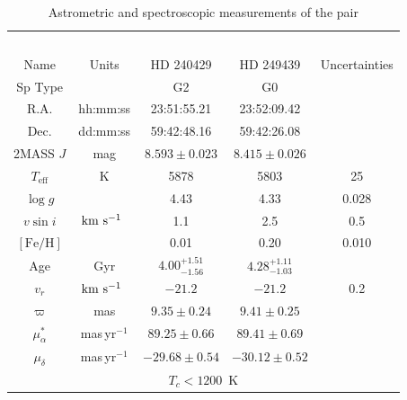 \documentclass[12pt,letterpaper,margin=1in]{article}
\newcommand*\elem[1]{\ensuremath{\mathrm{#1}}}
\newcommand{\sunanalog}{\text{Krios}}
\newcommand{\bizarreone}{\text{Kronos}}
\newcommand{\kms}{\ensuremath{\rm km~s^{-1}}}
\begin{document}
\begin{table}[htpb]
  \centering
  \begin{threeparttable}
  \caption{Astrometric and spectroscopic measurements of the pair\label{tab:t1}}
\begin{tabular}{ccccc}
\hline\hline
                        &                & \sunanalog\            & \bizarreone\           &               \\
Name                    & Units          & HD 240429              & HD 249439              & Uncertainties \\
\hline
Sp Type                 &                & G2                     & G0                     &               \\
R.A.\tnote{a}           & hh:mm:ss       & 23:51:55.21            & 23:52:09.42            &               \\
Dec.\tnote{a}           & dd:mm:ss       & 59:42:48.16            & 59:42:26.08            &               \\
2MASS $J$\tnote{a}      & mag            & $8.593 \pm 0.023$      & $8.415 \pm 0.026$      &               \\
$T_\mathrm{eff}$        & K              & 5878                   & 5803                   & 25            \\
$\log{g}$               &                & 4.43                   & 4.33                   & 0.028         \\
$v\sin{i}$              & \kms\          & 1.1                    & 2.5                    & 0.5           \\
$[\elem{Fe}/\elem{H}]$  &                & 0.01                   & 0.20                   & 0.010         \\
Age\tnote{b}            & Gyr            & $4.00_{-1.56}^{+1.51}$ & $4.28_{-1.03}^{+1.11}$ &               \\
$v_r$                   & \kms\          & $-21.2$                & $-21.2$                & 0.2           \\
$\varpi$\tnote{a}       & mas            & $9.35 \pm 0.24$        & $9.41 \pm 0.25$        &               \\
$\mu_\alpha^*$\tnote{a} & mas\,yr$^{-1}$ & $89.25 \pm 0.66$       & $89.41 \pm 0.69$       &               \\
$\mu_\delta$\tnote{a}   & mas\,yr$^{-1}$ & $-29.68 \pm 0.54$      & $-30.12 \pm 0.52$      &               \\
\hline
\multicolumn{5}{c}{$T_c < 1200$~K} \\

\end{tabular}
\end{threeparttable}
\end{table}
\end{document}
